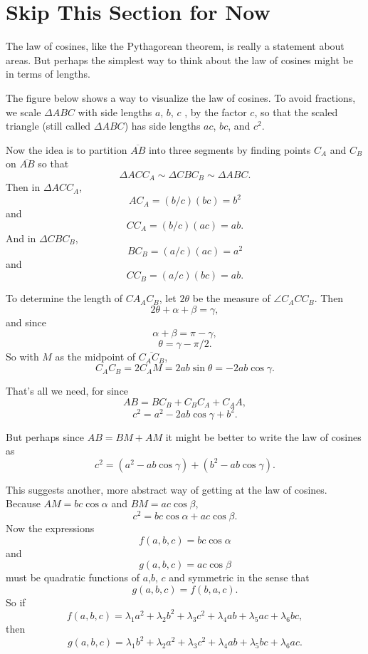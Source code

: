 \documentclass{ximera}
\begin{document}
\section{Skip This Section for Now}

\begin{exploration}
The law of cosines, like the Pythagorean theorem, is really a statement about areas. But perhaps the simplest way to think about the law of cosines might be in terms of lengths. 

The figure below shows a way to visualize the law of cosines. To avoid fractions, we scale $\Delta ABC$ with side lengths $a$, $b$, $c$ , by the factor $c$, so that the scaled triangle (still called $\Delta ABC$) has side lengths $ac$, $bc$, and $c^2$.

 
\begin{onlineOnly}
    \begin{center}
\end{center}
\end{onlineOnly}


Now the idea is to partition $\overline{AB}$ into three segments by finding points $C_A$ and $C_B$ on $\overline{AB}$ so that
\[ 
    \Delta ACC_A \sim \Delta C BC_B \sim \Delta ABC .
\]
Then in $\Delta ACC_A$,
\[
    AC_A = (b/c)(bc) = b^2
\]
and
\[
  CC_A = (b/c)(ac) = ab.
\]
And in $\Delta C BC_B $,
\[
    BC_B = (a/c)(ac) = a^2
\]
and
\[
  CC_B = (a/c)(bc) = ab.
\]

To determine the length of $CA_A C_B$, let $2\theta$ be the measure of $\angle C_A C C_B$. Then
\[
     2\theta + \alpha + \beta = \gamma ,
\]
and since
\[
    \alpha + \beta = \pi - \gamma ,
\]
\[
   \theta = \gamma - \pi/2.
\]
So with $M$ as the midpoint of $\overline{C_A C_B}$,
\[
   C_A C_B = 2 C_A M = 2ab \sin \theta = -2ab\cos\gamma .
\]

That's all we need, for since
\[
    AB = BC_B + C_B C_A + C_AA ,
\]
\[
  c^2 = a^2 - 2ab \cos \gamma + b^2 .
\]

But perhaps since $AB = BM +AM$ it might be better to write the law of cosines as
\[
   c^2 = (a^2 -ab\cos\gamma) + (b^2- ab\cos \gamma) .
\]

This suggests another, more abstract way of getting at the law of cosines. Because $AM = bc \cos \alpha$ and $BM = ac \cos\beta$,
\[
   c^2 = bc \cos \alpha + ac \cos \beta .
\]
Now the expressions 
\[
   f(a,b,c) = bc \cos\alpha
\]
and
\[
   g(a,b,c) = ac \cos \beta
\]
must be quadratic functions of $a$,$b$, $c$ and symmetric in the sense that
\[
  g(a,b,c) = f(b,a,c) .
\]
So if
\[
  f(a,b,c) = \lambda_1 a^2 + \lambda_2 b^2 + \lambda_3 c^2 + \lambda_4 ab + \lambda_5 ac + \lambda_6 bc ,
\]
then
\[
  g(a,b,c) = \lambda_1 b^2 + \lambda_2 a^2 + \lambda_3 c^2 + \lambda_4 ab + \lambda_5 bc + \lambda_6 ac  .
\]

\end{exploration}
\end{document}
